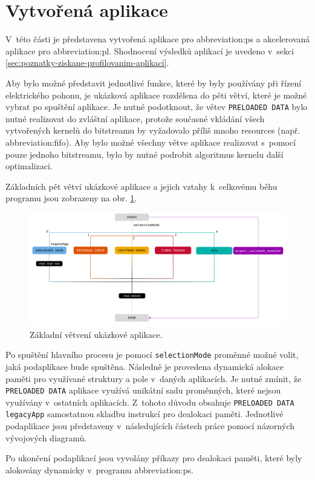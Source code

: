 \documentclass[a4paper, twoside, 11pt]{article}
\newcommand{\fbar}{\FloatBarrier}
\begin{document}
\section{Vytvořená aplikace}\label{sec:vytvorena-aplikace}
 V~této části je představena vytvořená aplikace pro \gls{abbreviation:ps} a akcelerovaná aplikace pro \gls{abbreviation:pl}. Shodnocení výsledků aplikací je uvedeno v~sekci \ref{sec:poznatky-ziskane-profilovanim-aplikaci}.\par
 Aby bylo možné představit jednotlivé funkce, které by byly používány při řízení elektrického pohonu, je ukázková aplikace rozdělena do pěti větví, které je možné vybrat po spuštění aplikace. Je nutné podotknout, že větev \texttt{PRELOADED DATA} bylo nutné realizovat do zvláštní aplikace, protože současné vkládání všech vytvořených kernelů do bitstreamu by vyžadovalo příliš mnoho resources (např. \gls{abbreviation:fifo}). Aby bylo možné všechny větve aplikace realizovat s~pomocí pouze jednoho bitstreamu, bylo by nutné podrobit algoritmus kernelu další optimalizaci.\par
 Základních pět větví ukázkové aplikace a jejich vztahy k~celkovému běhu programu jsou zobrazeny na obr. \ref{fig:application-overview}.

 \begin{figure}[htbp!]
	\centering
	\includegraphics[width=1\textwidth]{src/pdf/application-overview.pdf}
	\caption{Základní větvení ukázkové aplikace.}
	\label{fig:application-overview}
\end{figure}
	Po spuštění hlavního procesu je pomocí \texttt{selectionMode} proměnné možné volit, jaká podaplikace bude spuštěna. Následně je provedena dynamická alokace paměti pro využívané struktury a pole v~daných aplikacích. Je nutné zmínit, že \texttt{PRELOADED DATA} aplikace využívá unikátní sadu proměnných, které nejsou využívány v~ostatních aplikacích. Z~tohoto důvodu obsahuje \texttt{PRELOADED DATA} \texttt{legacyApp} samostatnou skladbu instrukcí pro dealokaci paměti. Jednotlivé podaplikace jsou představeny v~následujících částech práce pomocí názorných vývojových diagramů.\par
	Po ukončení podaplikací jsou vyvolány příkazy pro dealokaci paměti, které byly alokovány dynamicky v~programu \gls{abbreviation:ps}.\par
	\fbar
\end{document}

